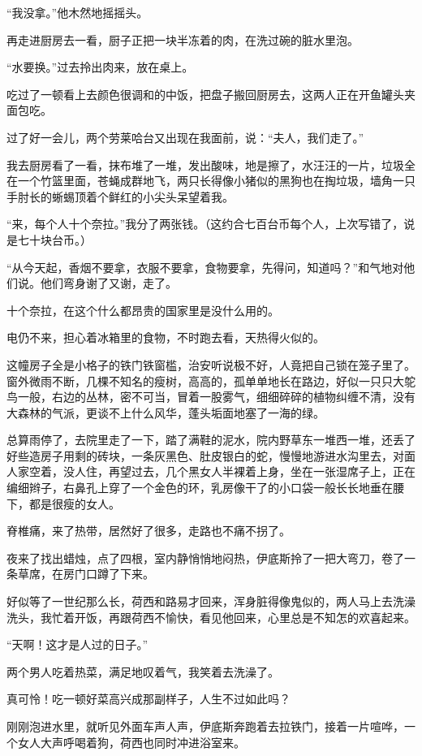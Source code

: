 \par “我没拿。”他木然地摇摇头。
\par 再走进厨房去一看，厨子正把一块半冻着的肉，在洗过碗的脏水里泡。
\par “水要换。”过去拎出肉来，放在桌上。
\par 吃过了一顿看上去颜色很调和的中饭，把盘子搬回厨房去，这两人正在开鱼罐头夹面包吃。
\par 过了好一会儿，两个劳莱哈台又出现在我面前，说：“夫人，我们走了。”
\par 我去厨房看了一看，抹布堆了一堆，发出酸味，地是擦了，水汪汪的一片，垃圾全在一个竹篮里面，苍蝇成群地飞，两只长得像小猪似的黑狗也在掏垃圾，墙角一只手肘长的蜥蜴顶着个鲜红的小尖头呆望着我。
\par “来，每个人十个奈拉。”我分了两张钱。（这约合七百台币每个人，上次写错了，说是七十块台币。）
\par “从今天起，香烟不要拿，衣服不要拿，食物要拿，先得问，知道吗？”和气地对他们说。他们弯身谢了又谢，走了。
\par 十个奈拉，在这个什么都昂贵的国家里是没什么用的。
\par 电仍不来，担心着冰箱里的食物，不时跑去看，天热得火似的。
\par 这幢房子全是小格子的铁门铁窗槛，治安听说极不好，人竟把自己锁在笼子里了。窗外微雨不断，几棵不知名的瘦树，高高的，孤单单地长在路边，好似一只只大鸵鸟一般，右边的丛林，密不可当，冒着一股雾气，细细碎碎的植物纠缠不清，没有大森林的气派，更谈不上什么风华，蓬头垢面地塞了一海的绿。
\par 总算雨停了，去院里走了一下，踏了满鞋的泥水，院内野草东一堆西一堆，还丢了好些造房子用剩的砖块，一条灰黑色、肚皮银白的蛇，慢慢地游进水沟里去，对面人家空着，没人住，再望过去，几个黑女人半裸着上身，坐在一张湿席子上，正在编细辫子，右鼻孔上穿了一个金色的环，乳房像干了的小口袋一般长长地垂在腰下，都是很瘦的女人。
\par 脊椎痛，来了热带，居然好了很多，走路也不痛不拐了。
\par 夜来了找出蜡烛，点了四根，室内静悄悄地闷热，伊底斯拎了一把大弯刀，卷了一条草席，在房门口蹲了下来。
\par 好似等了一世纪那么长，荷西和路易才回来，浑身脏得像鬼似的，两人马上去洗澡洗头，我忙着开饭，再跟荷西不愉快，看见他回来，心里总是不知怎的欢喜起来。
\par “天啊！这才是人过的日子。”
\par 两个男人吃着热菜，满足地叹着气，我笑着去洗澡了。
\par 真可怜！吃一顿好菜高兴成那副样子，人生不过如此吗？
\par 刚刚泡进水里，就听见外面车声人声，伊底斯奔跑着去拉铁门，接着一片喧哗，一个女人大声呼喝着狗，荷西也同时冲进浴室来。
